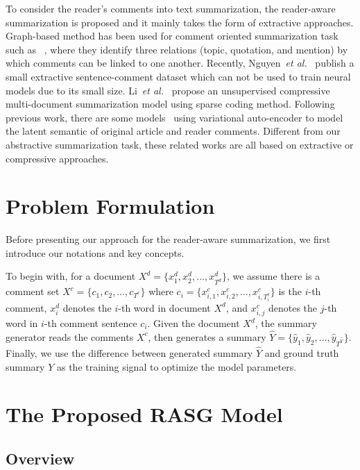 \documentclass[letterpaper]{article} \usepackage{aaai19}  \usepackage{times}  \usepackage{helvet}  \usepackage{courier}
\newcommand{\etal}{\emph{et al.}\xspace}
\begin{document}
To consider the reader's comments into text summarization, the reader-aware summarization is proposed and it mainly takes the form of extractive approaches. 
Graph-based method has been used for comment oriented summarization task such as ~\cite{Hu2007CommentsorientedBS,Hu2008CommentsorientedDS},  where they identify three relations (topic, quotation, and mention) by which comments can be linked to one another.
Recently, Nguyen~\etal~ publish a small extractive sentence-comment dataset which can not be used to train neural models due to its small size. 
Li~\etal~ propose an unsupervised compressive multi-document summarization model using sparse coding method.
Following previous work, there are some models~\cite{li2017reader,Li2017SalienceEV} using variational auto-encoder to model the latent semantic of original article and reader comments.
Different from our abstractive summarization task, these related works are all based on extractive or compressive approaches.


    
\section{Problem Formulation}
\label{sec:formulation}

Before presenting our approach for the reader-aware summarization, we first introduce our notations and key concepts. 




To begin with, for a document $X^d=\{x^d_1, x^d_2, \dots, x^d_{T^d}\}$, we assume there is a comment set $X^c=\{c_1, c_2, \dots, c_{T^c}\}$ where $c_i = \{x^c_{i,1}, x^c_{i,2}, \dots, x^c_{i,T^c_{i}}\}$ is the $i$-th comment, $x^d_i$ denotes the $i$-th word in document $X^d$, and $x^c_{i,j}$ denotes the $j$-th word in $i$-th comment sentence $c_i$.
Given the document $X^d$, the summary generator reads the comments $X^c$, then generates a summary $\hat{Y} = \{\hat{y}_1, \hat{y}_2, \dots, \hat{y}_{T^{\hat{Y}}}\}$.
Finally, we use the difference between generated summary $\hat{Y}$ and ground truth summary $Y$ as the training signal to optimize the model parameters.

\section{The Proposed RASG Model}

\subsection{Overview}
\end{document}
